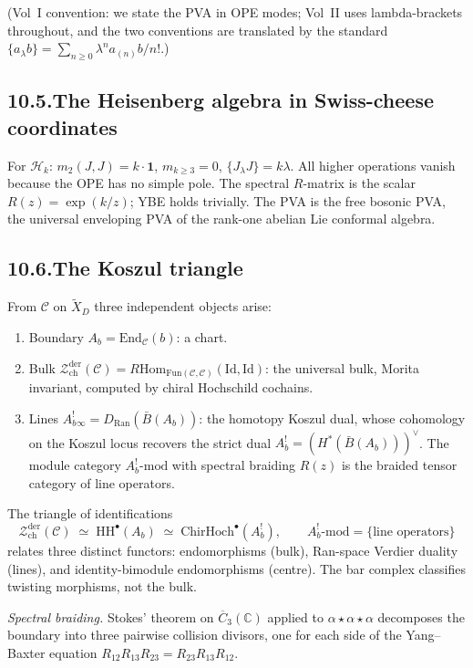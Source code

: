 \documentclass[11pt,reqno]{amsart}
\theoremstyle{definition}
\theoremstyle{remark}
\providecommand{\cC}{\mathcal{C}}
\providecommand{\cH}{\mathcal{H}}
\providecommand{\cZ}{\mathcal{Z}}
\providecommand{\barB}{\bar{B}}
\providecommand{\Ran}{\mathrm{Ran}}
\providecommand{\Hom}{\mathrm{Hom}}
\providecommand{\FM}{\overline{C}}
\providecommand{\bC}{\mathbb{C}}
\providecommand{\HH}{\mathrm{HH}}
\providecommand{\Fun}{\mathrm{Fun}}
\providecommand{\End}{\mathrm{End}}
\providecommand{\der}{\mathrm{der}}
\providecommand{\ch}{\mathrm{ch}}
\providecommand{\Id}{\mathrm{Id}}
\numberwithin{equation}{section}
\begin{document}
(Vol~I convention: we state the PVA in OPE modes; Vol~II uses
lambda-brackets throughout, and the two conventions are
translated by the standard
$\{a_\lambda b\} = \sum_{n \ge 0}\lambda^n a_{(n)}b/n!$.)

\subsection*{10.5.\enspace The Heisenberg algebra in Swiss-cheese coordinates}

For $\cH_k$: $m_2(J, J) = k \cdot \mathbf 1$,
$m_{k \ge 3} = 0$, $\{J_\lambda J\} = k\lambda$. All higher
operations vanish because the OPE has no simple pole. The
spectral $R$-matrix is the scalar $R(z) = \exp(k/z)$; YBE
holds trivially. The PVA is the free bosonic PVA, the
universal enveloping PVA of the rank-one abelian Lie conformal
algebra.

\subsection*{10.6.\enspace The Koszul triangle}

From $\cC$ on $\widetilde X_D$ three independent objects arise:
\begin{enumerate}[label=\textup{(\roman*)},nosep]
\item Boundary $A_b = \End_\cC(b)$: a chart.
\item Bulk $\cZ^{\der}_{\ch}(\cC) =
R\Hom_{\Fun(\cC,\cC)}(\Id, \Id)$: the universal bulk, Morita
invariant, computed by chiral Hochschild cochains.
\item Lines
$A_b^!{}_\infty = D_{\Ran}(\barB(A_b))$: the homotopy Koszul
dual, whose cohomology on the Koszul locus recovers the strict
dual $A_b^! = (H^*(\barB(A_b)))^\vee$. The module category
$A_b^!\text{-mod}$ with spectral braiding $R(z)$ is the
braided tensor category of line operators.
\end{enumerate}
The triangle of identifications
\[
\cZ^{\der}_{\ch}(\cC)
\;\simeq\;
\HH^\bullet(A_b)
\;\simeq\;
\mathrm{ChirHoch}^\bullet(A_b^!),
\qquad
A_b^!\text{-mod} = \{\text{line operators}\}
\]
relates three distinct functors: endomorphisms (bulk),
Ran-space Verdier duality (lines), and identity-bimodule
endomorphisms (centre). The bar complex classifies twisting
morphisms, not the bulk.

\medskip\noindent\emph{Spectral braiding.} Stokes' theorem on
$\FM_3(\bC)$ applied to $\alpha\star\alpha\star\alpha$ decomposes
the boundary into three pairwise collision divisors, one for
each side of the Yang--Baxter equation
$R_{12}R_{13}R_{23} = R_{23}R_{13}R_{12}$.
\end{document}
